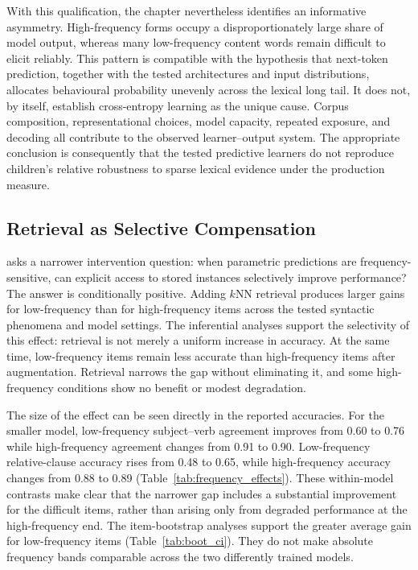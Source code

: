 With this qualification, the chapter nevertheless identifies an informative asymmetry. High-frequency forms occupy a disproportionately large share of model output, whereas many low-frequency content words remain difficult to elicit reliably. This pattern is compatible with the hypothesis that next-token prediction, together with the tested architectures and input distributions, allocates behavioural probability unevenly across the lexical long tail. It does not, by itself, establish cross-entropy learning as the unique cause. Corpus composition, representational choices, model capacity, repeated exposure, and decoding all contribute to the observed learner--output system. The appropriate conclusion is consequently that the tested predictive learners do not reproduce children's relative robustness to sparse lexical evidence under the \meCDI{} production measure.

\subsection{Retrieval as Selective Compensation}

 asks a narrower intervention question: when parametric predictions are frequency-sensitive, can explicit access to stored instances selectively improve performance? The answer is conditionally positive. Adding $k$NN retrieval produces larger gains for low-frequency than for high-frequency items across the tested syntactic phenomena and model settings. The inferential analyses support the selectivity of this effect: retrieval is not merely a uniform increase in accuracy. At the same time, low-frequency items remain less accurate than high-frequency items after augmentation. Retrieval narrows the gap without eliminating it, and some high-frequency conditions show no benefit or modest degradation.

The size of the effect can be seen directly in the reported accuracies. For the smaller model, low-frequency subject--verb agreement improves from 0.60 to 0.76 while high-frequency agreement changes from 0.91 to 0.90. Low-frequency relative-clause accuracy rises from 0.48 to 0.65, while high-frequency accuracy changes from 0.88 to 0.89 (Table~\ref{tab:frequency_effects}). These within-model contrasts make clear that the narrower gap includes a substantial improvement for the difficult items, rather than arising only from degraded performance at the high-frequency end. The item-bootstrap analyses support the greater average gain for low-frequency items (Table~\ref{tab:boot_ci}). They do not make absolute frequency bands comparable across the two differently trained models.

